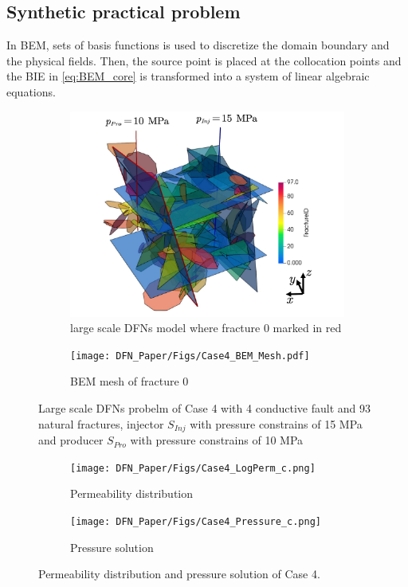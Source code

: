 \documentclass[num-refs]{wiley-networks}
\begin{document}
\subsection{Synthetic practical problem}
In BEM, sets of basis functions is used to discretize the domain boundary and the physical fields. Then, the source point is placed at the collocation points and the BIE in \eqref{eq:BEM_core} is transformed into a system of linear algebraic equations.

\begin{figure}
\centering
     \begin{subfigure}[b]{0.45\textwidth}
         \centering
         \includegraphics[width=\textwidth]{Case4_Domain.pdf}
         \caption{large scale DFNs model where fracture 0 marked in red}
     \end{subfigure}
\quad
     \begin{subfigure}[b]{0.35\textwidth}
         \centering
         \texttt{[image: DFN\_Paper/Figs/Case4\_BEM\_Mesh.pdf]}
         \caption{BEM mesh of fracture 0}
     \end{subfigure}
\label{fig:Case4_Domain_Mesh}
\caption{Large scale DFNs probelm of Case 4 with 4 conductive fault and 93 natural fractures, injector $S_{Inj}$ with pressure constrains of 15 MPa and producer $S_{Pro}$ with pressure constrains of 10 MPa}
\end{figure}

\begin{figure}
\centering
     \begin{subfigure}[b]{0.4\textwidth}
         \centering
         \texttt{[image: DFN\_Paper/Figs/Case4\_LogPerm\_c.png]}
         \caption{Permeability distribution}
     \end{subfigure}
\quad
     \begin{subfigure}[b]{0.4\textwidth}
         \centering
         \texttt{[image: DFN\_Paper/Figs/Case4\_Pressure\_c.png]}
         \caption{Pressure solution}
     \end{subfigure}
\label{fig:Case3_Solution}
\caption{Permeability distribution and pressure solution of Case 4.}
\end{figure}
\end{document}
